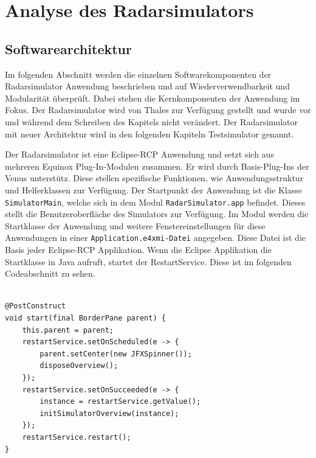 \section{Analyse des Radarsimulators}

\subsection{Softwarearchitektur}

Im folgenden Abschnitt werden die einzelnen Softwarekomponenten der Radarsimulator Anwendung beschrieben und auf Wiederverwendbarkeit und Modularität überprüft. Dabei stehen die Kernkomponenten der Anwendung im Fokus. Der Radarsimulator wird von Thales zur Verfügung gestellt und wurde vor und während dem Schreiben des Kapitels nicht verändert. Der Radarsimulator mit neuer Architektur wird in den folgenden Kapiteln Testsimulator genannt.

Der Radarsimulator ist eine Eclipse-RCP Anwendung und setzt sich aus mehreren Equinox Plug-In-Modulen zusammen. Er wird durch Basis-Plug-Ins der Venus unterstütz. Diese stellen spezifische Funktionen, wie Anwendungsstruktur und Helferklassen zur Verfügung. Der Startpunkt der Anwendung ist die Klasse \texttt{SimulatorMain}, welche sich in dem Modul \texttt{RadarSimulator.app} befindet. Dieses stellt die Benutzeroberfläche des Simulators zur Verfügung. Im Modul werden die Startklasse der Anwendung und weitere Fenstereinstellungen für diese Anwendungen in einer \texttt{Application.e4xmi-Datei} angegeben. Diese Datei ist die Basis jeder Eclipse-RCP Applikation. Wenn die Eclipse Applikation die Startklasse in Java aufruft, startet der RestartService. Diese ist im folgenden Codeabschnitt zu sehen.


\begin{lstlisting}

@PostConstruct
void start(final BorderPane parent) {
    this.parent = parent;
    restartService.setOnScheduled(e -> {
        parent.setCenter(new JFXSpinner());
        disposeOverview();
    });
    restartService.setOnSucceeded(e -> {
        instance = restartService.getValue();
        initSimulatorOverview(instance);
    });
    restartService.restart();
}

\end{lstlisting}

